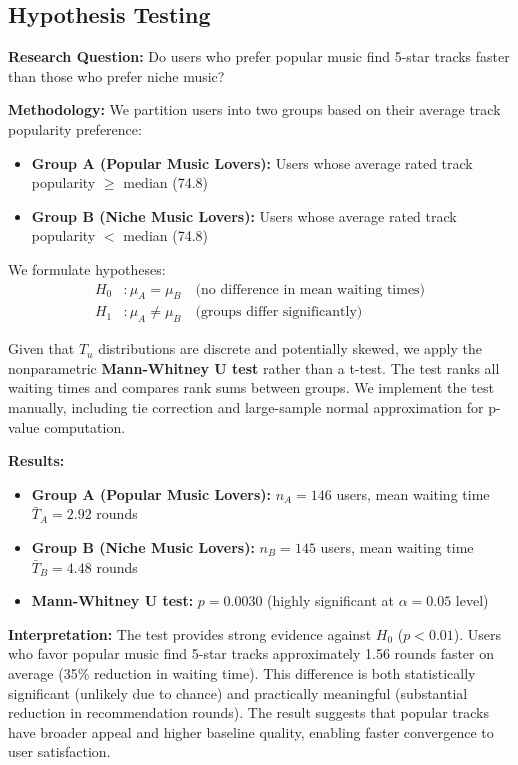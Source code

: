 \documentclass[12pt,a4paper]{article}
\begin{document}
\subsection{Hypothesis Testing}

\textbf{Research Question:} Do users who prefer popular music find 5-star tracks faster than those who prefer niche music?

\textbf{Methodology:} We partition users into two groups based on their average track popularity preference:
\begin{itemize}
    \item \textbf{Group A (Popular Music Lovers):} Users whose average rated track popularity $\geq$ median (74.8)
    \item \textbf{Group B (Niche Music Lovers):} Users whose average rated track popularity $<$ median (74.8)
\end{itemize}

We formulate hypotheses:
\begin{align}
H_0 &: \mu_A = \mu_B \quad \text{(no difference in mean waiting times)} \\
H_1 &: \mu_A \neq \mu_B \quad \text{(groups differ significantly)}
\end{align}

Given that $T_u$ distributions are discrete and potentially skewed, we apply the nonparametric \textbf{Mann-Whitney U test} rather than a t-test. The test ranks all waiting times and compares rank sums between groups. We implement the test manually, including tie correction and large-sample normal approximation for p-value computation.

\textbf{Results:}
\begin{itemize}
    \item \textbf{Group A (Popular Music Lovers):} $n_A = 146$ users, mean waiting time $\bar{T}_A = 2.92$ rounds
    \item \textbf{Group B (Niche Music Lovers):} $n_B = 145$ users, mean waiting time $\bar{T}_B = 4.48$ rounds
    \item \textbf{Mann-Whitney U test:} $p = 0.0030$ (highly significant at $\alpha = 0.05$ level)
\end{itemize}

\textbf{Interpretation:} The test provides strong evidence against $H_0$ ($p < 0.01$). Users who favor popular music find 5-star tracks approximately 1.56 rounds faster on average (35\% reduction in waiting time). This difference is both statistically significant (unlikely due to chance) and practically meaningful (substantial reduction in recommendation rounds). The result suggests that popular tracks have broader appeal and higher baseline quality, enabling faster convergence to user satisfaction.
\end{document}
